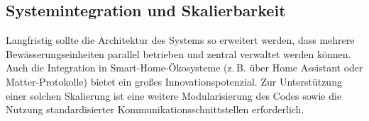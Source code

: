 \subsection{Systemintegration und Skalierbarkeit}

Langfristig sollte die Architektur des Systems so erweitert werden, dass mehrere Bewässerungseinheiten parallel betrieben und zentral verwaltet werden können. Auch die Integration in Smart-Home-Ökosysteme (z.\,B. über Home Assistant oder Matter-Protokolle) bietet ein großes Innovationspotenzial. Zur Unterstützung einer solchen Skalierung ist eine weitere Modularisierung des Codes sowie die Nutzung standardisierter Kommunikationsschnittstellen erforderlich.